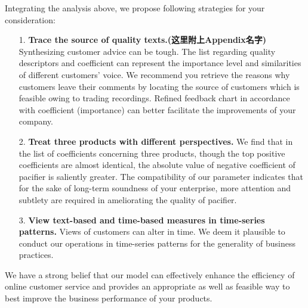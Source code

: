 \documentclass[12pt]{article}%
\begin{document}
Integrating the analysis above, we propose following strategies for your consideration:

\begin{itemize}
	\item[1.]\textbf{Trace the source of quality texts.(这里附上Appendix名字)} Synthesizing customer advice can be tough. The list regarding quality descriptors and coefficient can represent the importance level and similarities of different customers’ voice. We recommend you retrieve the reasons why customers leave their comments by locating the source of customers which is feasible owing to trading recordings. Refined feedback chart in accordance with coefficient (importance) can better facilitate the improvements of your company.
	\item[2.]\textbf{Treat three products with different perspectives.} We find that in the list of coefficients concerning three products, though the top positive coefficients are almost identical, the absolute value of negative coefficient of pacifier is saliently greater. The compatibility of our parameter indicates that for the sake of long-term soundness of your enterprise, more attention and subtlety are required in ameliorating the quality of pacifier. 
	\item[3.]\textbf{View text-based and time-based measures in time-series patterns.} Views of customers can alter in time. We deem it plausible to conduct our operations in time-series patterns for the generality of business practices.
\end{itemize}

We have a strong belief that our model can effectively enhance the efficiency of online customer service and provides an appropriate as well as feasible way to best improve the business performance of your products.



\thispagestyle{empty}

\newpage
\thispagestyle{empty}
\tableofcontents   
\setcounter{page}{0}                                               
\newpage      

\fontsize{13}{12.5}\selectfont
\setmainfont{TeX Gyre Pagella}    
\pagestyle{fancy} 
\chead{}  \lfoot{}	%
\cfoot{\thepage}
\rfoot{}
\end{document}
